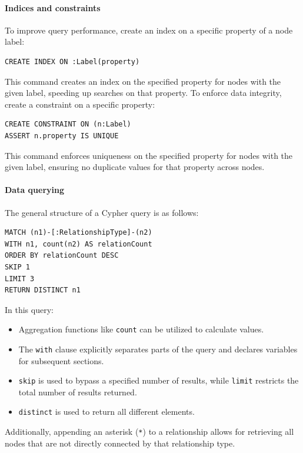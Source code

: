 \paragraph*{Indices and constraints}
To improve query performance, create an index on a specific property of a node label:

\begin{lstlisting}[style=Cypher]
CREATE INDEX ON :Label(property)
\end{lstlisting}
This command creates an index on the specified property for nodes with the given label, speeding up searches on that property.
To enforce data integrity, create a constraint on a specific property:

\begin{lstlisting}[style=Cypher]
CREATE CONSTRAINT ON (n:Label)
ASSERT n.property IS UNIQUE
\end{lstlisting}
This command enforces uniqueness on the specified property for nodes with the given label, ensuring no duplicate values for that property across nodes.

\paragraph*{Data querying}
The general structure of a Cypher query is as follows:

\begin{lstlisting}[style=Cypher]
MATCH (n1)-[:RelationshipType]-(n2)
WITH n1, count(n2) AS relationCount
ORDER BY relationCount DESC
SKIP 1 
LIMIT 3
RETURN DISTINCT n1
\end{lstlisting}
In this query:
\begin{itemize}
    \item Aggregation functions like \texttt{count} can be utilized to calculate values.
    \item The \texttt{with} clause explicitly separates parts of the query and declares variables for subsequent sections.
    \item \texttt{skip} is used to bypass a specified number of results, while \texttt{limit} restricts the total number of results returned.
    \item \texttt{distinct} is used to return all different elements.
\end{itemize}
Additionally, appending an asterisk (\texttt{*}) to a relationship allows for retrieving all nodes that are not directly connected by that relationship type.

